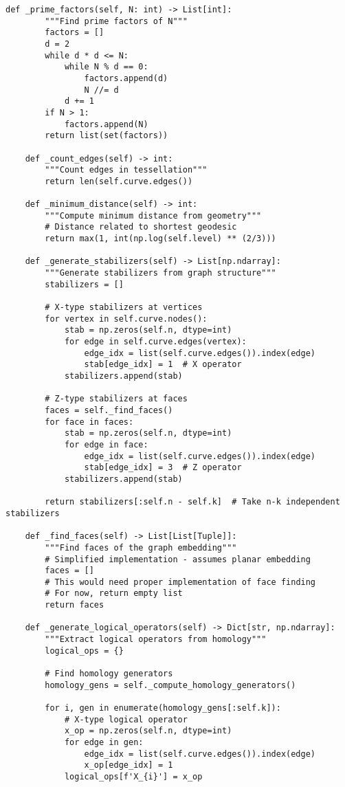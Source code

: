 \documentclass[12pt,a4paper]{article}
\begin{document}
\begin{lstlisting}[style=python,caption=Modular surface code on Shimura variety]
    def _prime_factors(self, N: int) -> List[int]:
        """Find prime factors of N"""
        factors = []
        d = 2
        while d * d <= N:
            while N % d == 0:
                factors.append(d)
                N //= d
            d += 1
        if N > 1:
            factors.append(N)
        return list(set(factors))
    
    def _count_edges(self) -> int:
        """Count edges in tessellation"""
        return len(self.curve.edges())
    
    def _minimum_distance(self) -> int:
        """Compute minimum distance from geometry"""
        # Distance related to shortest geodesic
        return max(1, int(np.log(self.level) ** (2/3)))
    
    def _generate_stabilizers(self) -> List[np.ndarray]:
        """Generate stabilizers from graph structure"""
        stabilizers = []
        
        # X-type stabilizers at vertices
        for vertex in self.curve.nodes():
            stab = np.zeros(self.n, dtype=int)
            for edge in self.curve.edges(vertex):
                edge_idx = list(self.curve.edges()).index(edge)
                stab[edge_idx] = 1  # X operator
            stabilizers.append(stab)
        
        # Z-type stabilizers at faces
        faces = self._find_faces()
        for face in faces:
            stab = np.zeros(self.n, dtype=int)
            for edge in face:
                edge_idx = list(self.curve.edges()).index(edge)
                stab[edge_idx] = 3  # Z operator
            stabilizers.append(stab)
        
        return stabilizers[:self.n - self.k]  # Take n-k independent stabilizers
    
    def _find_faces(self) -> List[List[Tuple]]:
        """Find faces of the graph embedding"""
        # Simplified implementation - assumes planar embedding
        faces = []
        # This would need proper implementation of face finding
        # For now, return empty list
        return faces
    
    def _generate_logical_operators(self) -> Dict[str, np.ndarray]:
        """Extract logical operators from homology"""
        logical_ops = {}
        
        # Find homology generators
        homology_gens = self._compute_homology_generators()
        
        for i, gen in enumerate(homology_gens[:self.k]):
            # X-type logical operator
            x_op = np.zeros(self.n, dtype=int)
            for edge in gen:
                edge_idx = list(self.curve.edges()).index(edge)
                x_op[edge_idx] = 1
            logical_ops[f'X_{i}'] = x_op
            

\end{lstlisting}
\end{document}
